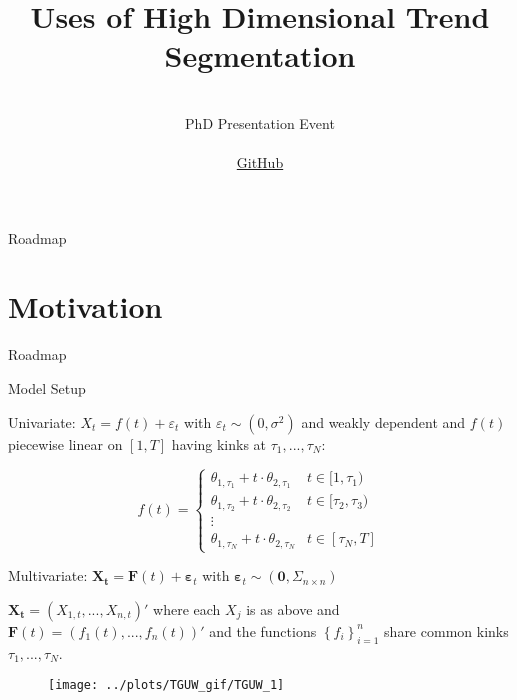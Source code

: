 \documentclass{beamer}
\title[Trend Segmentation]{Uses of High Dimensional Trend Segmentation}
\institute[LSE Department of Statistics]{}
\date[8 May 2017]{
  \hspace{1cm}\\
  PhD Presentation Event\\
  \hspace{1cm}\\
  \href{https://github.com/Shakeel95/PhD-Presentation-1}{GitHub}}
\begin{document}
\begin{frame}
  \titlepage
\end{frame}


\begin{frame}{Roadmap}
  \tableofcontents
\end{frame}



\section{Motivation}



\begin{frame}{Roadmap}
\tableofcontents[currentsection]
\end{frame}


\begin{frame}{Model Setup}

Univariate: $X_t = f(t) + \varepsilon_t$ with $\varepsilon_t \sim \left ( 0, \sigma^2 \right )$ and weakly dependent and $f(t)$ piecewise linear on $[1,T]$ having kinks at $\tau_1,..., \tau_N$: 

\begin{equation*}
    f(t) = 
    \left\{\begin{matrix}
            \theta_{1,\tau_1} + t \cdot \theta_{2,\tau_1} & t \in [1, \tau_1) \\ 
            \theta_{1,\tau_2} + t \cdot \theta_{2,\tau_2} & t \in [\tau_2, \tau_3)\\ 
            \vdots & \\ 
            \theta_{1,\tau_N} + t \cdot \theta_{2,\tau_N} & t \in [\tau_N,T]
    \end{matrix}\right.
\end{equation*}

Multivariate: $\boldsymbol{X_t} = \boldsymbol{F}(t) + \boldsymbol{\varepsilon}_t$ with $\boldsymbol{\varepsilon}_t \sim \left ( \boldsymbol{0}, \Sigma_{n \times n} \right )$

$\boldsymbol{X_t} = \left ( X_{1,t},...,X_{n,t}\right )'$ where each $X_j$ is as above and $\boldsymbol{F}(t) = \left ( f_1(t), ..., f_n(t)\right )'$ and the functions $\left \{ f_i\right \}_{i=1}^n$ share common kinks $\tau_1,..., \tau_N$.

\end{frame}


\begin{frame}

\begin{figure}[h]
    \centering
    \texttt{[image: ../plots/TGUW\_gif/TGUW\_1]}
    \label{model 3 cov}
\end{figure}

\end{frame}

\begin{frame}
\begin{figure}[h]
	\centering
\end{figure}
\end{frame}
\end{document}
